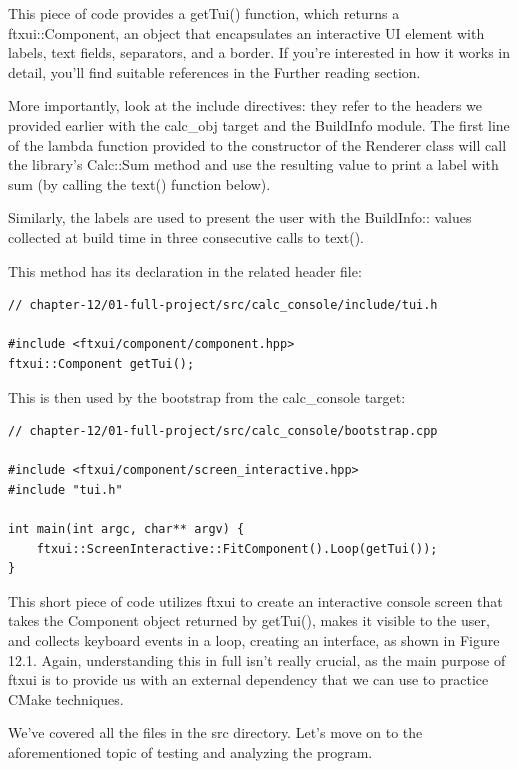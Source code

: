 This piece of code provides a getTui() function, which returns a ftxui::Component, an object that encapsulates an interactive UI element with labels, text fields, separators, and a border. If you're interested in how it works in detail, you'll find suitable references in the Further reading section.

More importantly, look at the include directives: they refer to the headers we provided earlier with the calc\_obj target and the BuildInfo module. The first line of the lambda function provided to the constructor of the Renderer class will call the library's Calc::Sum method and use the resulting value to print a label with sum (by calling the text() function below).

Similarly, the labels are used to present the user with the BuildInfo:: values collected at build time in three consecutive calls to text().

This method has its declaration in the related header file:

\begin{lstlisting}[style=styleCXX]
// chapter-12/01-full-project/src/calc_console/include/tui.h

#include <ftxui/component/component.hpp>
ftxui::Component getTui();
\end{lstlisting}

This is then used by the bootstrap from the calc\_console target:

\begin{lstlisting}[style=styleCXX]
// chapter-12/01-full-project/src/calc_console/bootstrap.cpp

#include <ftxui/component/screen_interactive.hpp>
#include "tui.h"

int main(int argc, char** argv) {
	ftxui::ScreenInteractive::FitComponent().Loop(getTui());
}
\end{lstlisting}

This short piece of code utilizes ftxui to create an interactive console screen that takes the Component object returned by getTui(), makes it visible to the user, and collects keyboard events in a loop, creating an interface, as shown in Figure 12.1. Again, understanding this in full isn't really crucial, as the main purpose of ftxui is to provide us with an external dependency that we can use to practice CMake techniques.

We've covered all the files in the src directory. Let's move on to the aforementioned topic of testing and analyzing the program.





